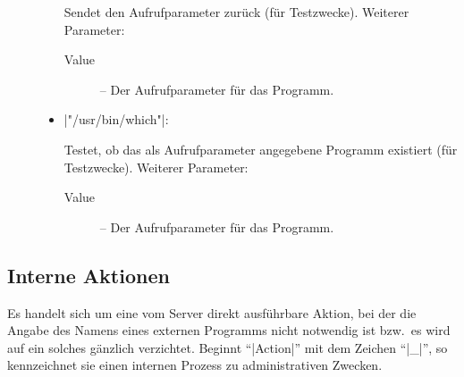 \documentclass[%
fontsize=11pt
,paper=a4
,twoside
,headings=normal
,numbers=endperiod
,pagesize
]{scrartcl}
\begin{document}
\begin{description}
\begin{itemize}
      Sendet den Aufrufparameter zurück (für Testzwecke). Weiterer Parameter:
      \begin{description}

        \item[Value] -- Der Aufrufparameter für das Programm.

      \end{description}

    \item |"/usr/bin/which"|: \par

      Testet, ob das als Aufrufparameter angegebene Programm existiert (für
      Testzwecke). Weiterer Parameter:
      \begin{description}

        \item[Value] -- Der Aufrufparameter für das Programm.

      \end{description}

  \end{itemize}

\end{description}

\subsection{Interne Aktionen}

  Es handelt sich um eine vom Server direkt ausführbare Aktion, bei der die
  Angabe des Namens eines externen Programms nicht notwendig ist bzw.\ es
  wird auf ein solches gänzlich verzichtet. Beginnt "`|Action|"' mit dem
  Zeichen "`|_|"', so kennzeichnet sie einen internen Prozess zu
  administrativen Zwecken.
\end{document}
